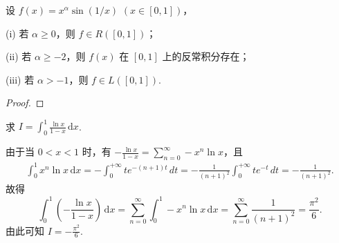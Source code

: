 \documentclass[../../main.tex]{subfiles}
\begin{document}
\begin{example}
设 \( f(x) = x^{\alpha} \sin(1/x) \) \( (x \in [0, 1]) \)，

(i) 若 \( \alpha \geq 0 \)，则 \( f \in R([0, 1]) \)；

(ii) 若 \( \alpha \geq -2 \)，则 \( f(x) \) 在 \( [0, 1] \) 上的反常积分存在；

(iii) 若 \( \alpha > -1 \)，则 \( f \in L([0, 1]) \).
\end{example}
\begin{proof}

\end{proof}

\begin{example}
求 \( I = \int_0^1 \frac{\ln x}{1 - x} \, \mathrm{d}x \).
\end{example}
\begin{solution}
由于当 \( 0 < x < 1 \) 时，有 \( -\frac{\ln x}{1 - x} = \sum_{n = 0}^{\infty} -x^n \ln x \)，且
\begin{align*}
\int_0^1 x^n \ln x \, \mathrm{d}x = -\int_0^{+\infty} t e^{-(n + 1)t} \, dt = -\frac{1}{(n + 1)^2} \int_0^{+\infty} t e^{-t} \, dt = -\frac{1}{(n + 1)^2}.
\end{align*}
故得
\[
\int_0^1 \left( -\frac{\ln x}{1 - x} \right) \, \mathrm{d}x = \sum_{n = 0}^{\infty} \int_0^1 -x^n \ln x \, \mathrm{d}x = \sum_{n = 0}^{\infty} \frac{1}{(n + 1)^2} = \frac{\pi^2}{6}.
\]
由此可知 \( I = -\frac{\pi^2}{6} \).
\end{solution}
\end{document}

